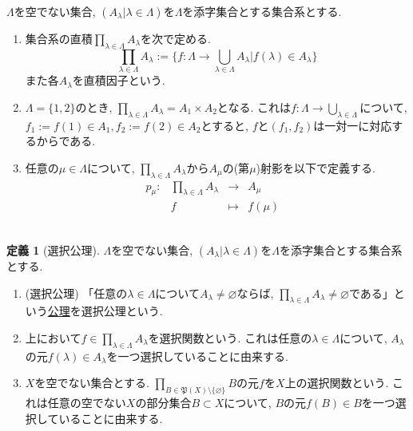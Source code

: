 \documentclass[dvipdfmx,a4paper,11pt]{article}
\theoremstyle{definition}
\newtheorem{dfn}[thm]{定義}
\begin{document}
\begin{tcolorbox}[
    colback = white,
    colframe = black!35!black,
    fonttitle = \bfseries,
    breakable = true]
    $\Lambda$を空でない集合, $(A_{\lambda} | \lambda \in \Lambda)$を$\Lambda$を添字集合とする集合系とする. 
    \begin{enumerate}
    \setlength{\parskip}{0cm} 
  \setlength{\itemsep}{0cm} 
  \item 集合系の直積$\prod_{\lambda \in \Lambda} A_{\lambda}$を次で定める.
  $$
  \prod_{\lambda \in \Lambda} A_{\lambda}
  :=\{  f : \Lambda \to \bigcup_{\lambda \in \Lambda}A_{\lambda} | f(\lambda) \in A_{\lambda}\}
  $$
  また各$A_{\lambda}$を直積因子という. 
  \item $\Lambda = \{ 1, 2\}$のとき, $\prod_{\lambda \in \Lambda} A_{\lambda}=A_1 \times A_2$となる. これは$f : \Lambda \to \bigcup_{\lambda \in \Lambda} $について, $f_1 :=f(1) \in A_1, f_2:=f(2) \in A_2$とすると, $f$と$(f_1, f_2)$は一対一に対応するからである. 
\item 任意の$\mu \in \Lambda$について, $ \prod_{\lambda \in \Lambda} A_{\lambda}$から$A_{\mu}$の(第$\mu$)射影を以下で定義する. 
$$
\begin{array}{ccccc}
p_{\mu } : &\prod_{\lambda \in \Lambda} A_{\lambda}& \rightarrow &A_{\mu }& \\
&f& \longmapsto & 
f(\mu )
 &
\end{array}
$$　
   \end{enumerate}
 \end{tcolorbox}
 
 
\begin{tcolorbox}[
    colback = white,
    colframe = black!35!black,
    fonttitle = \bfseries,
    breakable = true]
    \begin{dfn}[選択公理]
    $\Lambda$を空でない集合, $(A_{\lambda} | \lambda \in \Lambda)$を$\Lambda$を添字集合とする集合系とする. 
    \begin{enumerate}
    \setlength{\parskip}{0cm} 
  \setlength{\itemsep}{0cm} 
  \item (選択公理) 「任意の$\lambda \in \Lambda$について$A_{\lambda} \neq \varnothing$ならば, $\prod_{\lambda \in \Lambda} A_{\lambda} \neq \varnothing$である」という\underline{公理}を選択公理という.
  \item 上において$f \in \prod_{\lambda \in \Lambda} A_{\lambda}$を選択関数という. これは任意の$\lambda \in \Lambda$について, $A_{\lambda}$の元$f(\lambda) \in A_{\lambda}$を一つ選択していることに由来する.
  \item $X$を空でない集合とする. $\prod_{B \in \mathfrak{P}(X) \setminus \{ \varnothing\}} B$の元$f$を$X$上の選択関数という. 
  これは任意の空でない$X$の部分集合$B \subset X$について, $B$の元$f(B) \in B$を一つ選択していることに由来する. 
  \end{enumerate}
    \end{dfn}
 \end{tcolorbox}
 
\end{document}

